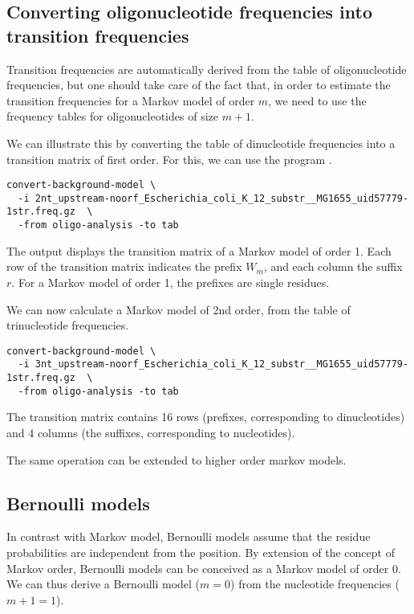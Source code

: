 \subsection{Converting oligonucleotide frequencies into transition frequencies}

Transition frequencies are automatically derived from the table of
oligonucleotide frequencies, but one should take care of the fact
that, in order to estimate the transition frequencies for a Markov
model of order $m$, we need to use the frequency tables for
oligonucleotides of size $m+1$.

We can illustrate this by converting the table of dinucleotide
frequencies into a transition matrix of first order. For this, we can
use the program .

\begin{small}
\begin{verbatim}
convert-background-model \
  -i 2nt_upstream-noorf_Escherichia_coli_K_12_substr__MG1655_uid57779-1str.freq.gz  \
  -from oligo-analysis -to tab
\end{verbatim}
\end{small}

The output displays the transition matrix of a Markov model of order
1.  Each row of the transition matrix indicates the prefix $W_m$, and
each column the suffix $r$. For a Markov model of order 1, the
prefixes are single residues.

We can now calculate a Markov model of 2nd order, from the table of
trinucleotide frequencies.

\begin{small}
\begin{verbatim}
convert-background-model \
  -i 3nt_upstream-noorf_Escherichia_coli_K_12_substr__MG1655_uid57779-1str.freq.gz  \
  -from oligo-analysis -to tab
\end{verbatim}
\end{small}

The transition matrix contains 16 rows (prefixes, corresponding to
dinucleotides) and 4 columns (the suffixes, corresponding to
nucleotides).

The same operation can be extended to higher order markov models.

\subsection{Bernoulli models}

In contrast with Markov model, Bernoulli models assume that the
residue probabilities are independent from the position. By extension
of the concept of Markov order, Bernoulli models can be conceived as a
Markov model of order 0. We can thus derive a Bernoulli model ($m=0$)
from the nucleotide frequencies ($m+1=1$).

